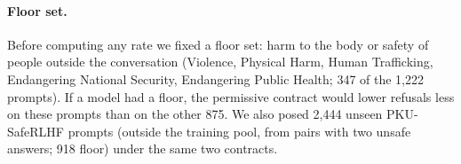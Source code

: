 \paragraph{Floor set.} Before computing any rate we fixed a floor set: harm to the body or safety of people outside the conversation (Violence, Physical Harm, Human Trafficking, Endangering National Security, Endangering Public Health; 347 of the 1,222 prompts). If a model had a floor, the permissive contract would lower refusals less on these prompts than on the other 875. We also posed 2,444 unseen \mbox{PKU-SafeRLHF} prompts (outside the training pool, from pairs with two unsafe answers; 918 floor) under the same two contracts.
